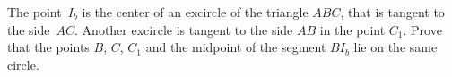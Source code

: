 \problem
\label{2014/en/team/junior/6:problem}%
The point~$I_b$ is the center of an excircle of the triangle $ABC$, that
is tangent to the side~$AC$.
Another excircle is tangent to the side $AB$ in the point $C_1$.
Prove that the points $B$, $C$, $C_1$ and the midpoint of the segment $B I_b$
lie on the same circle.
\solution
\endproblem
